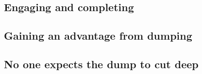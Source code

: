 \documentclass{tufte-handout}
\begin{document}
\subsection{Engaging and completing}
\label{sec:person-match_engaging}

\subsection{Gaining an advantage from dumping}
\label{sec:person-match_advantage}





\subsection{No one expects the dump to cut deep}





\end{document}
